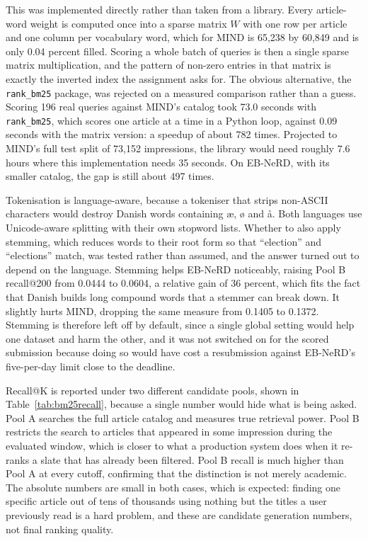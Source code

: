 \documentclass[11pt]{article}
\begin{document}
This was implemented directly rather than taken from a library. Every article-word weight is
computed once into a sparse matrix $W$ with one row per article and one column per vocabulary
word, which for MIND is 65,238 by 60,849 and is only 0.04 percent filled. Scoring a whole
batch of queries is then a single sparse matrix multiplication, and the pattern of non-zero
entries in that matrix is exactly the inverted index the assignment asks for. The obvious
alternative, the \texttt{rank\_bm25} package, was rejected on a measured comparison rather than
a guess. Scoring 196 real queries against MIND's catalog took 73.0 seconds with
\texttt{rank\_bm25}, which scores one article at a time in a Python loop, against 0.09 seconds
with the matrix version: a speedup of about 782 times. Projected to MIND's full test split of
73,152 impressions, the library would need roughly 7.6 hours where this implementation needs
35 seconds. On EB-NeRD, with its smaller catalog, the gap is still about 497 times.

Tokenisation is language-aware, because a tokeniser that strips non-ASCII characters would
destroy Danish words containing \ae{}, \o{} and \aa{}. Both languages use Unicode-aware
splitting with their own stopword lists. Whether to also apply stemming, which reduces words
to their root form so that ``election'' and ``elections'' match, was tested rather than
assumed, and the answer turned out to depend on the language. Stemming helps EB-NeRD
noticeably, raising Pool B recall@200 from 0.0444 to 0.0604, a relative gain of 36 percent,
which fits the fact that Danish builds long compound words that a stemmer can break down. It
slightly hurts MIND, dropping the same measure from 0.1405 to 0.1372. Stemming is therefore
left off by default, since a single global setting would help one dataset and harm the other,
and it was not switched on for the scored submission because doing so would have cost a
resubmission against EB-NeRD's five-per-day limit close to the deadline.

Recall@K is reported under two different candidate pools, shown in Table~\ref{tab:bm25recall},
because a single number would hide what is being asked. Pool A searches the full article
catalog and measures true retrieval power. Pool B restricts the search to articles that
appeared in some impression during the evaluated window, which is closer to what a production
system does when it re-ranks a slate that has already been filtered. Pool B recall is much
higher than Pool A at every cutoff, confirming that the distinction is not merely academic.
The absolute numbers are small in both cases, which is expected: finding one specific article
out of tens of thousands using nothing but the titles a user previously read is a hard problem,
and these are candidate generation numbers, not final ranking quality.
\end{document}
